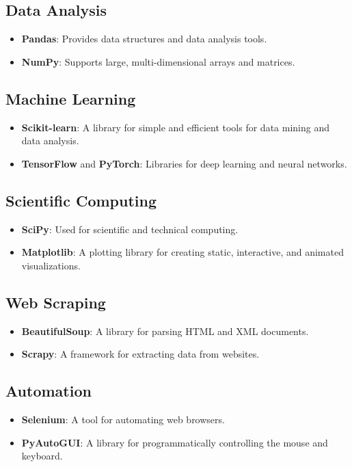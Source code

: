 \documentclass{article}
\begin{document}
	\subsection{Data Analysis}
	\begin{itemize}
		\item \textbf{Pandas}: Provides data structures and data analysis tools.
		\item \textbf{NumPy}: Supports large, multi-dimensional arrays and matrices.
	\end{itemize}
	
	\subsection{Machine Learning}
	\begin{itemize}
		\item \textbf{Scikit-learn}: A library for simple and efficient tools for data mining and data analysis.
		\item \textbf{TensorFlow} and \textbf{PyTorch}: Libraries for deep learning and neural networks.
	\end{itemize}
	
	\subsection{Scientific Computing}
	\begin{itemize}
		\item \textbf{SciPy}: Used for scientific and technical computing.
		\item \textbf{Matplotlib}: A plotting library for creating static, interactive, and animated visualizations.
	\end{itemize}
	
	\subsection{Web Scraping}
	\begin{itemize}
		\item \textbf{BeautifulSoup}: A library for parsing HTML and XML documents.
		\item \textbf{Scrapy}: A framework for extracting data from websites.
	\end{itemize}
	
	\subsection{Automation}
	\begin{itemize}
		\item \textbf{Selenium}: A tool for automating web browsers.
		\item \textbf{PyAutoGUI}: A library for programmatically controlling the mouse and keyboard.
	\end{itemize}
	
\end{document}
